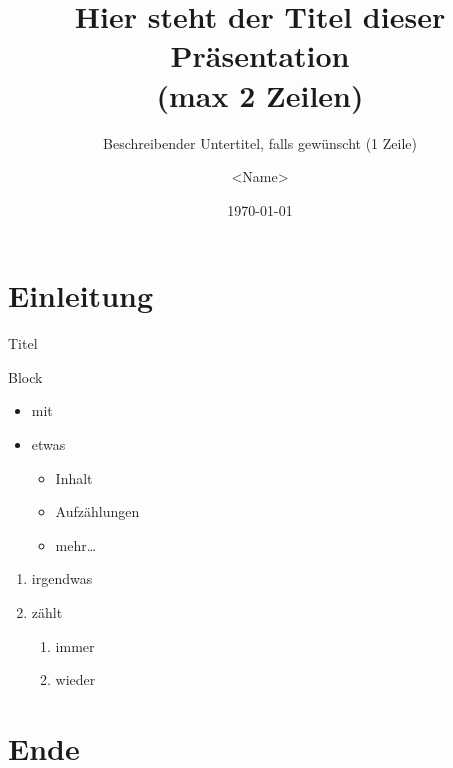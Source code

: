 \usepackage[utf8]{inputenc}
\usepackage[ngerman]{babel}
\usepackage{amsmath}
\usepackage{tikz}
\usepackage{etex}

\title[kurzer Titel]{Hier steht der Titel dieser Präsentation\\ (max 2 Zeilen)}
\subtitle{Beschreibender Untertitel, falls gewünscht (1 Zeile)}
\author[Kurzname]{\textless{}Name\textgreater}
\date{\today}



\begin{frame}[plain]
  \titlepage
\end{frame}


\section{Einleitung}

\begin{frame}{Titel}
  \begin{block}{Block}
    \begin{itemize}
      \item mit
      \item etwas
      \begin{itemize}
        \item Inhalt
        \item Aufzählungen
        \item mehr\dots
      \end{itemize}
    \end{itemize}
  \end{block}
\end{frame}


\begin{frame}
\begin{enumerate}
\item irgendwas
\item zählt
  \begin{enumerate}
  \item immer
  \item wieder
  \end{enumerate}
\end{enumerate}
\end{frame}



\section{Ende}


